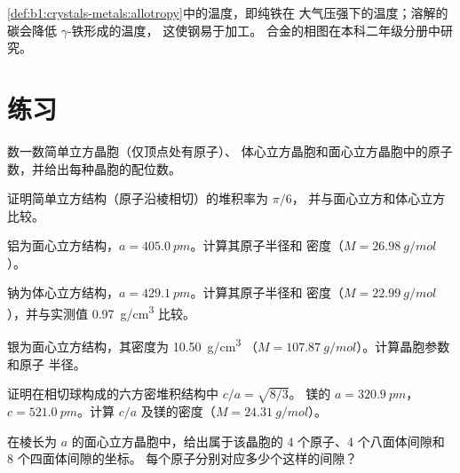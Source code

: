 \begin{remark}[铁的相变]\label{rem:b1:crystals-metals:iron-T}
\cref{def:b1:crystals-metals:allotropy}中的温度，即纯铁在
大气压强下的温度；溶解的碳会降低 $\gamma$-铁形成的温度，
这使钢易于加工。
合金的相图在本科二年级分册中研究。
\end{remark}

\section{练习}

\begin{exercise}[$\star$]\label{exo:b1:crystals-metals:1}
数一数简单立方晶胞（仅顶点处有原子）、
体心立方晶胞和面心立方晶胞中的原子数，并给出每种晶胞的配位数。
\end{exercise}

\begin{exercise}[$\star$]\label{exo:b1:crystals-metals:2}
证明简单立方结构（原子沿棱相切）的堆积率为 $\pi/6$，
并与面心立方和体心立方比较。
\end{exercise}

\begin{exercise}[$\star$]\label{exo:b1:crystals-metals:3}
铝为面心立方结构，$a = \qty{405.0}{pm}$。计算其原子半径和
密度（$M = \qty{26.98}{g/mol}$）。
\end{exercise}

\begin{exercise}[$\star$]\label{exo:b1:crystals-metals:4}
钠为体心立方结构，$a = \qty{429.1}{pm}$。计算其原子半径和
密度（$M = \qty{22.99}{g/mol}$），并与实测值
\qty{0.97}{g/cm^3} 比较。
\end{exercise}

\begin{exercise}[$\star\star$]\label{exo:b1:crystals-metals:5}
银为面心立方结构，其密度为 \qty{10.50}{g/cm^3}
（$M = \qty{107.87}{g/mol}$）。计算晶胞参数和原子
半径。
\end{exercise}

\begin{exercise}[$\star\star$]\label{exo:b1:crystals-metals:6}
证明在相切球构成的六方密堆积结构中 $c/a = \sqrt{8/3}$。
镁的 $a = \qty{320.9}{pm}$，$c = \qty{521.0}{pm}$。计算 $c/a$
及镁的密度（$M = \qty{24.31}{g/mol}$）。
\end{exercise}

\begin{exercise}[$\star\star$]\label{exo:b1:crystals-metals:7}
在棱长为 $a$ 的面心立方晶胞中，给出属于该晶胞的
4 个原子、4 个八面体间隙和 8 个四面体间隙的坐标。
每个原子分别对应多少个这样的间隙？
\end{exercise}

